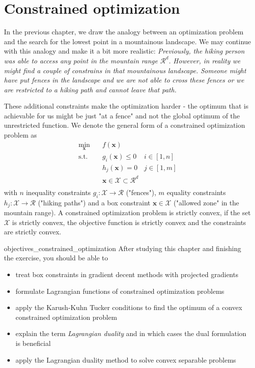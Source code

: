 \chapter{Constrained optimization}
In the previous chapter, we draw the analogy between an optimization problem and the search for the lowest point in a mountainous landscape. We may continue with this analogy and make it a bit more realistic: \emph{Previously, the hiking person was able to access any point in the mountain range $\mathcal{R}^d$. However, in reality we might find a couple of constrains in that mountainous landscape. Someone might have put fences in the landscape and we are not able to cross these fences or we are restricted to a hiking path and cannot leave that path.}

These additional constraints make the optimization harder - the optimum that is achievable for us might be just "at a fence" and not the global optimum of the unrestricted function.
We denote the general form of a constrained optimization problem as 
\begin{equation}
    \begin{aligned}
        \min_{\mathbf{x}} \quad & f(\mathbf{x})\\
        \textrm{s.t.} \quad & g_i(\mathbf{x}) \le 0    &i \in [1, n]\\
                            & h_j(\mathbf{x}) = 0  &j \in [1, m]\\
                            & \mathbf{x} \in \mathcal{X} \subset \mathcal{R}^d\\
    \end{aligned}
    \label{eq:constrained_optimization}
\end{equation}
with $n$ inequality constraints $g_i : \mathcal{X} \rightarrow \mathcal{R}$ ("fences"), $m$ equality constraints $h_j: \mathcal{X} \rightarrow \mathcal{R}$ ("hiking paths") and a box constraint $\mathbf{x} \in \mathcal{X}$ ("allowed zone" in the mountain range). A constrained optimization problem is strictly convex, if the set $\mathcal{X}$ is strictly convex, the objective function is strictly convex and the constraints are strictly convex.

\begin{objectives}{}{objectives_constrained_optimization}
After studying this chapter and finishing the exercise, you should be able to 
\begin{itemize}[label=$\dots$]
    \item treat box constraints in gradient decent methods with projected gradients
    \item formulate Lagrangian functions of constrained optimization problems
    \item apply the Karush-Kuhn Tucker conditions to find the optimum of a convex constrained optimization problem
    \item explain the term \emph{Lagrangian duality} and in which cases the dual formulation is beneficial
    \item apply the Lagrangian duality method to solve convex separable problems
\end{itemize}
\end{objectives}

